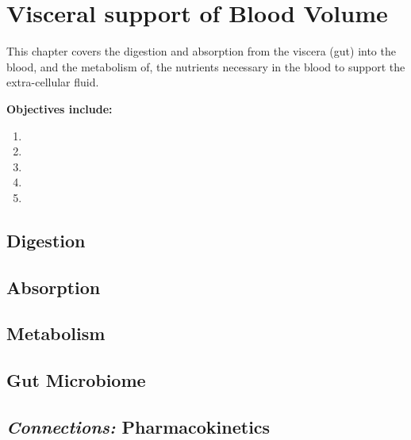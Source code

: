 \chapter{Visceral support of Blood Volume}\label{chp:blood_nutrients}

\minitoc
This chapter covers the digestion and absorption from the viscera (gut) into the blood, and the metabolism of, the nutrients necessary in the blood to support the extra-cellular fluid. 

\vspace{5mm}

\textbf{Objectives include:}
\begin{enumerate}
    \item
    \item
    \item
    \item
    \item
\end{enumerate}

\section{Digestion}

\section{Absorption}

\section{Metabolism}

\section{Gut Microbiome}

\section{\textit{Connections:} Pharmacokinetics}

\printbibliography[heading=subbibintoc]